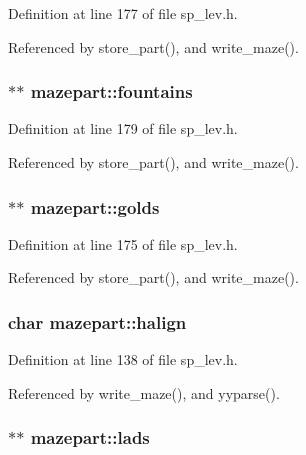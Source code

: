 Definition at line 177 of file sp\+\_\+lev.\+h.



Referenced by store\+\_\+part(), and write\+\_\+maze().

\hypertarget{structmazepart_af1aa16ce0bb42aaad6d3260cfe17f807}{
\subsubsection[{fountains}]{$\ast$$\ast$ mazepart\+::fountains}}\label{structmazepart_af1aa16ce0bb42aaad6d3260cfe17f807}


Definition at line 179 of file sp\+\_\+lev.\+h.



Referenced by store\+\_\+part(), and write\+\_\+maze().

\hypertarget{structmazepart_aaaeaf28ca273f27168372458d5adf1c4}{
\subsubsection[{golds}]{$\ast$$\ast$ mazepart\+::golds}}\label{structmazepart_aaaeaf28ca273f27168372458d5adf1c4}


Definition at line 175 of file sp\+\_\+lev.\+h.



Referenced by store\+\_\+part(), and write\+\_\+maze().

\hypertarget{structmazepart_a4732c03cc9b7ec27a0dafa4c0e7052b8}{
\subsubsection[{halign}]{\setlength{\rightskip}{0pt plus 5cm}char mazepart\+::halign}}\label{structmazepart_a4732c03cc9b7ec27a0dafa4c0e7052b8}


Definition at line 138 of file sp\+\_\+lev.\+h.



Referenced by write\+\_\+maze(), and yyparse().

\hypertarget{structmazepart_ad03167489d5683612969d4f7897e318e}{
\subsubsection[{lads}]{$\ast$$\ast$ mazepart\+::lads}}\label{structmazepart_ad03167489d5683612969d4f7897e318e}


